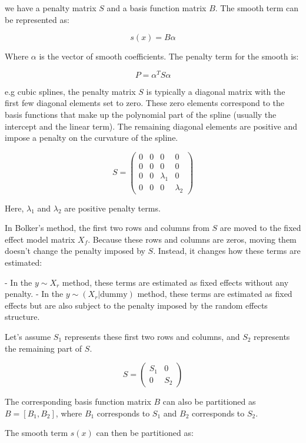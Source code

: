 \documentclass{article}
\begin{document}
we have a penalty matrix \(S\) and a basis function matrix \(B\). The smooth term can be represented as:

\[
s(x) = B \alpha
\]

Where \( \alpha \) is the vector of smooth coefficients. The penalty term for the smooth is:

\[
P = \alpha^T S \alpha
\]



e.g cubic splines, the penalty matrix \( S \) is typically a diagonal matrix with the first few diagonal elements set to zero. These zero elements correspond to the basis functions that make up the polynomial part of the spline (usually the intercept and the linear term). The remaining diagonal elements are positive and impose a penalty on the curvature of the spline.


\[
S = \begin{pmatrix}
0 & 0 & 0 & 0 \\
0 & 0 & 0 & 0 \\
0 & 0 & \lambda_1 & 0 \\
0 & 0 & 0 & \lambda_2
\end{pmatrix}
\]

Here, \( \lambda_1 \) and \( \lambda_2 \) are positive penalty terms.

In Bolker's method, the first two rows and columns from \( S \) are moved to the fixed effect model matrix \( X_f \). Because these rows and columns are zeros, moving them doesn't change the penalty imposed by \( S \). Instead, it changes how these terms are estimated:

- In the \( y \sim X_r \) method, these terms are estimated as fixed effects without any penalty.
- In the \( y \sim (X_r | \text{dummy}) \) method, these terms are estimated as fixed effects but are also subject to the penalty imposed by the random effects structure.
\newline

 Let's assume \(S_1\) represents these first two rows and columns, and \(S_2\) represents the remaining part of \(S\).

\[
S = \begin{pmatrix}
S_1 & 0 \\
0 & S_2
\end{pmatrix}
\]

The corresponding basis function matrix \(B\) can also be partitioned as \(B = [B_1, B_2]\), where \(B_1\) corresponds to \(S_1\) and \(B_2\) corresponds to \(S_2\).

The smooth term \(s(x)\) can then be partitioned as:
\end{document}

